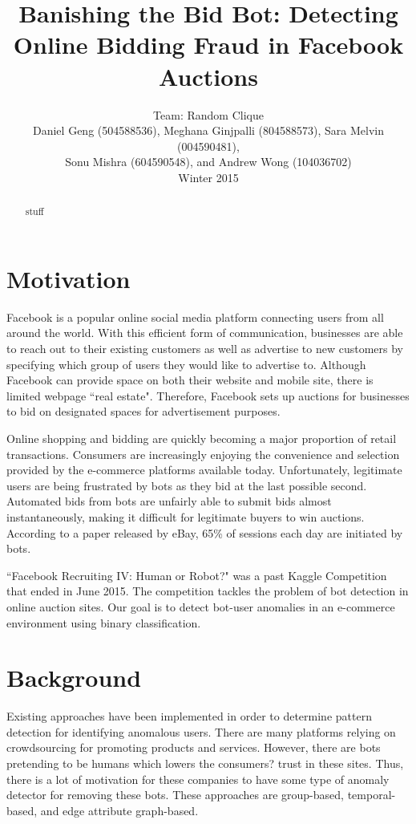 \documentclass{article} %
\title{Banishing the Bid Bot: Detecting Online Bidding Fraud in Facebook Auctions}
\author{
Team: Random Clique \\
Daniel Geng (504588536), Meghana Ginjpalli (804588573), Sara Melvin (004590481), \\
Sonu Mishra (604590548), and Andrew Wong (104036702) \\
Winter 2015
}
\begin{document}
\maketitle

\begin{abstract}

stuff

\end{abstract}

\section{Motivation}

Facebook is a popular online social media platform connecting users from all around the world.
With this efficient form of communication, businesses are able to reach out to their existing customers as well as advertise to new customers by specifying which group of users they would like to advertise to.
Although Facebook can provide space on both their website and mobile site, there is limited webpage ``real estate".
Therefore, Facebook sets up auctions for businesses to bid on designated spaces for advertisement purposes.

Online shopping and bidding are quickly becoming a major proportion of retail transactions. \cite{shopping}
Consumers are increasingly enjoying the convenience and selection provided by the e-commerce platforms available today.
Unfortunately, legitimate users are being frustrated by bots as they bid at the last possible second.
Automated bids from bots are unfairly able to submit bids almost instantaneously, making it difficult for legitimate buyers to win auctions.
According to a paper released by eBay, 65\% of sessions each day are initiated by bots. \cite{ebay}

``Facebook Recruiting IV: Human or Robot?" was a past Kaggle Competition that ended in June 2015.
The competition tackles the problem of bot detection in online auction sites.
Our goal is to detect bot-user anomalies in an e-commerce environment using binary classification. 

\section{Background}

Existing approaches have been implemented in order to determine pattern detection for identifying anomalous users.
There are many platforms relying on crowdsourcing for promoting products and services.
However, there are bots pretending to be humans which lowers the consumers? trust in these sites.
Thus, there is a lot of motivation for these companies to have some type of anomaly detector for removing these bots.
These approaches are group-based, temporal-based, and edge attribute graph-based.
\end{document}
